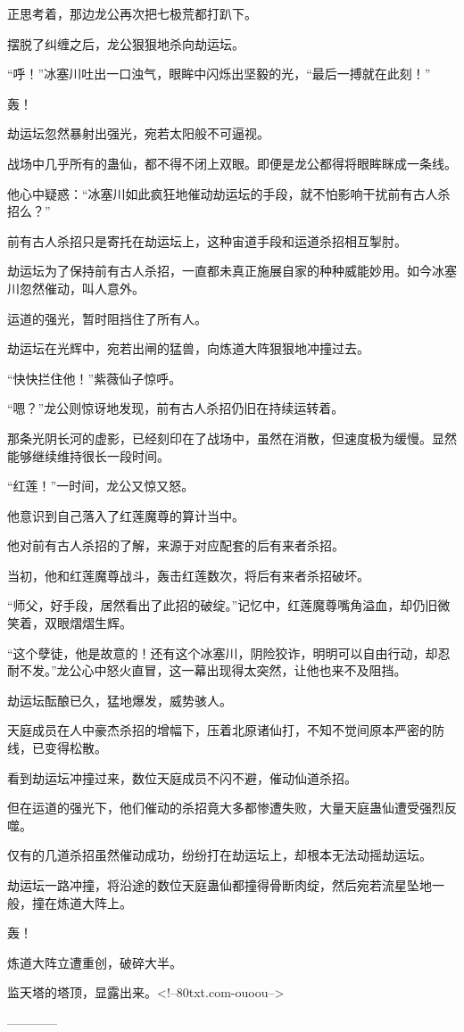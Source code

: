 \begin{this_body}
正思考着，那边龙公再次把七极荒都打趴下。

摆脱了纠缠之后，龙公狠狠地杀向劫运坛。

“呼！”冰塞川吐出一口浊气，眼眸中闪烁出坚毅的光，“最后一搏就在此刻！”

轰！

劫运坛忽然暴射出强光，宛若太阳般不可逼视。

战场中几乎所有的蛊仙，都不得不闭上双眼。即便是龙公都得将眼眸眯成一条线。

他心中疑惑：“冰塞川如此疯狂地催动劫运坛的手段，就不怕影响干扰前有古人杀招么？”

前有古人杀招只是寄托在劫运坛上，这种宙道手段和运道杀招相互掣肘。

劫运坛为了保持前有古人杀招，一直都未真正施展自家的种种威能妙用。如今冰塞川忽然催动，叫人意外。

运道的强光，暂时阻挡住了所有人。

劫运坛在光辉中，宛若出闸的猛兽，向炼道大阵狠狠地冲撞过去。

“快快拦住他！”紫薇仙子惊呼。

“嗯？”龙公则惊讶地发现，前有古人杀招仍旧在持续运转着。

那条光阴长河的虚影，已经刻印在了战场中，虽然在消散，但速度极为缓慢。显然能够继续维持很长一段时间。

“红莲！”一时间，龙公又惊又怒。

他意识到自己落入了红莲魔尊的算计当中。

他对前有古人杀招的了解，来源于对应配套的后有来者杀招。

当初，他和红莲魔尊战斗，轰击红莲数次，将后有来者杀招破坏。

“师父，好手段，居然看出了此招的破绽。”记忆中，红莲魔尊嘴角溢血，却仍旧微笑着，双眼熠熠生辉。

“这个孽徒，他是故意的！还有这个冰塞川，阴险狡诈，明明可以自由行动，却忍耐不发。”龙公心中怒火直冒，这一幕出现得太突然，让他也来不及阻挡。

劫运坛酝酿已久，猛地爆发，威势骇人。

天庭成员在人中豪杰杀招的增幅下，压着北原诸仙打，不知不觉间原本严密的防线，已变得松散。

看到劫运坛冲撞过来，数位天庭成员不闪不避，催动仙道杀招。

但在运道的强光下，他们催动的杀招竟大多都惨遭失败，大量天庭蛊仙遭受强烈反噬。

仅有的几道杀招虽然催动成功，纷纷打在劫运坛上，却根本无法动摇劫运坛。

劫运坛一路冲撞，将沿途的数位天庭蛊仙都撞得骨断肉绽，然后宛若流星坠地一般，撞在炼道大阵上。

轰！

炼道大阵立遭重创，破碎大半。

监天塔的塔顶，显露出来。<!--80txt.com-ouoou-->

------------

\end{this_body}

